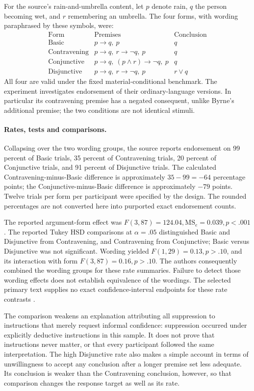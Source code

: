 For the source's rain-and-umbrella content, let \(p\) denote rain,
\(q\) the person becoming wet, and \(r\) remembering an umbrella.
The four forms, with wording paraphrased by these symbols, were:
\[
\begin{array}{l|l|l}
 \text{Form}&\text{Premises}&\text{Conclusion}\\\hline
 \text{Basic}&p\to q,\ p&q\\
 \text{Contravening}&p\to q,\ r\to\neg q,\ p&q\\
 \text{Conjunctive}&p\to q,\ (p\land r)\to\neg q,\ p&q\\
 \text{Disjunctive}&p\to q,\ r\to\neg q,\ p&r\lor q
\end{array}
\]
All four are valid under the fixed material-conditional benchmark. The
experiment investigates endorsement of their ordinary-language versions.
In particular its contravening premise has a negated consequent, unlike
Byrne's additional premise; the two conditions are not identical stimuli.

\paragraph{Rates, tests and comparisons.}
Collapsing over the two wording groups, the source reports endorsement
on 99 percent of Basic trials, 35 percent of Contravening trials,
20 percent of Conjunctive trials, and 91 percent of Disjunctive trials.
The calculated Contravening-minus-Basic difference is approximately
\(35-99=-64\) percentage points; the Conjunctive-minus-Basic difference
is approximately \(-79\) points. Twelve trials per form per participant
were specified by the design. The rounded percentages are not converted
here into purported exact endorsement counts.

The reported argument-form effect was
\(F(3,87)=124.04,\mathrm{MS}_e=0.039,p<.001\).
The reported Tukey HSD comparisons at \(\alpha=.05\) distinguished
Basic and Disjunctive from Contravening, and Contravening from Conjunctive;
Basic versus Disjunctive was not significant. Wording yielded
\(F(1,29)=0.13,p>.10\), and its interaction with form
\(F(3,87)=0.16,p>.10\). The authors consequently combined the wording
groups for these rate summaries. Failure to detect those wording effects
does not establish equivalence of the wordings. The selected primary
text supplies no exact confidence-interval endpoints for these rate
contrasts \cite[Secs.~5.1--5.2]{CarianiRips2017Suppression}.

The comparison weakens an explanation attributing all suppression to
instructions that merely request informal confidence: suppression occurred
under explicitly deductive instructions in this sample. It does not prove
that instructions never matter, or that every participant followed the
same interpretation. The high Disjunctive rate also makes a simple account
in terms of unwillingness to accept any conclusion after a longer premise
set less adequate. Its conclusion is weaker than the Contravening
conclusion, however, so that comparison changes the response target as
well as its rate.

